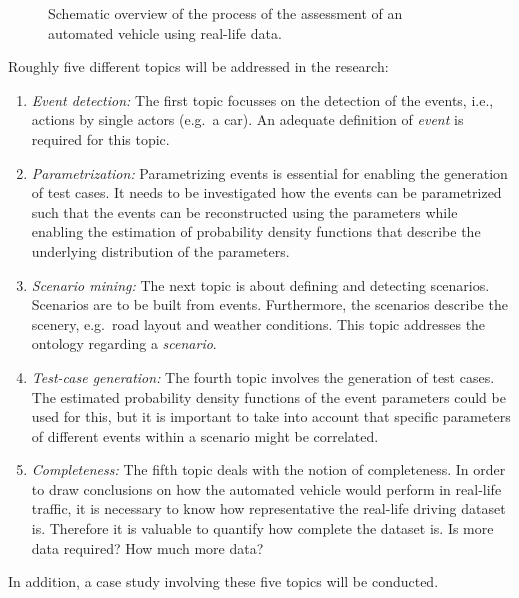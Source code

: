 \documentclass[10pt,final,a4paper,oneside,onecolumn]{article}
\begin{document}
\begin{figure}[b]
\begin{center}
		\vspace{-1.5em}
		\caption{Schematic overview of the process of the assessment of an automated vehicle using real-life data.}
		\label{fig:scheme}
	\end{center}
\end{figure}

Roughly five different topics will be addressed in the research:
\begin{enumerate}
	\item \emph{Event detection:}\,\,The first topic focusses on the detection of the events, i.e., actions by single actors (e.g.\ a car). An adequate definition of \emph{event} is required for this topic.
	\item \emph{Parametrization:}\,\,Parametrizing events is essential for enabling the generation of test cases. It needs to be investigated how the events can be parametrized such that the events can be reconstructed using the parameters while enabling the estimation of probability density functions that describe the underlying distribution of the parameters.
	\item \emph{Scenario mining:}\,\,The next topic is about defining and detecting scenarios. Scenarios are to be built from events. Furthermore, the scenarios describe the scenery, e.g.\ road layout and weather conditions. This topic addresses the ontology regarding a \emph{scenario}.
	\item \emph{Test-case generation:}\,\,The fourth topic involves the generation of test cases. The estimated probability density functions of the event parameters could be used for this, but it is important to take into account that specific parameters of different events within a scenario might be correlated.
	\item \emph{Completeness:}\,\,The fifth topic deals with the notion of completeness. In order to draw conclusions on how the automated vehicle would perform in real-life traffic, it is necessary to know how representative the real-life driving dataset is. Therefore it is valuable to quantify how complete the dataset is. Is more data required? How much more data?
\end{enumerate}

In addition, a case study involving these five topics will be conducted.
\end{document}
